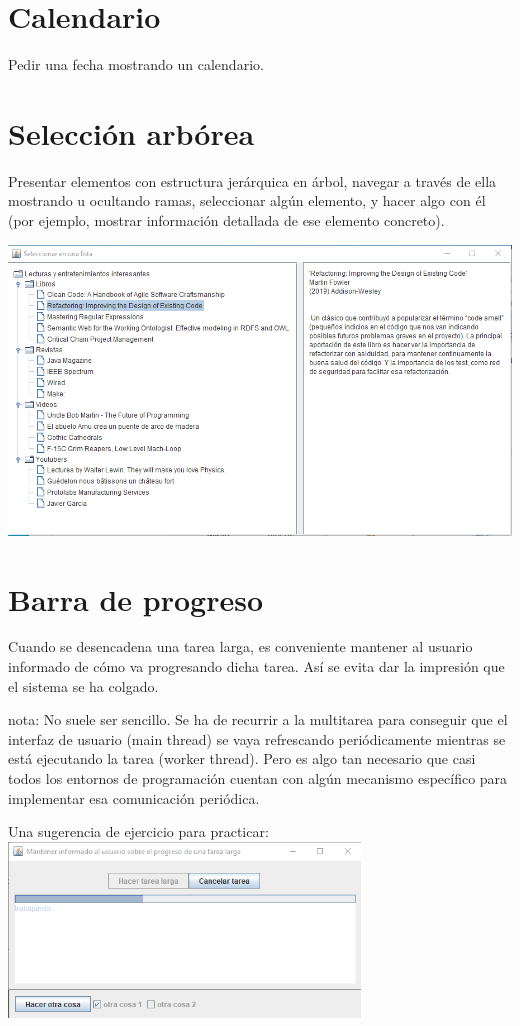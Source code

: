 \documentclass[spanish,12pt,a4paper,final,oneside]{book}
\begin{document}
\section{Calendario}\label{ejercicio_calendario}
Pedir una fecha mostrando un calendario.

\section{Selección arbórea}\label{ejercicio_selecionarborea}
Presentar elementos con estructura jerárquica en árbol, navegar a través de ella mostrando u ocultando ramas, seleccionar algún elemento, y hacer algo con él (por ejemplo, mostrar información detallada de ese elemento concreto).

\includegraphics[width=\textwidth]{Seleccion Arborea - pantallazo - Java}


\section{Barra de progreso}\label{ejercicio_barradeprogreso}
Cuando se desencadena una tarea larga, es conveniente mantener al usuario informado de cómo va progresando dicha tarea. Así se evita dar la impresión que el sistema se ha colgado.

nota: No suele ser sencillo. Se ha de recurrir a la multitarea para conseguir que el interfaz de usuario (main thread) se vaya refrescando periódicamente mientras se está ejecutando la tarea (worker thread). Pero es algo tan necesario que casi todos los entornos de programación cuentan con algún mecanismo específico para implementar esa comunicación periódica.

Una sugerencia de ejercicio para practicar:
\\ \includegraphics[width=0.7\textwidth]{BarraDeProgreso - pantallazo - Java}
\end{document}
